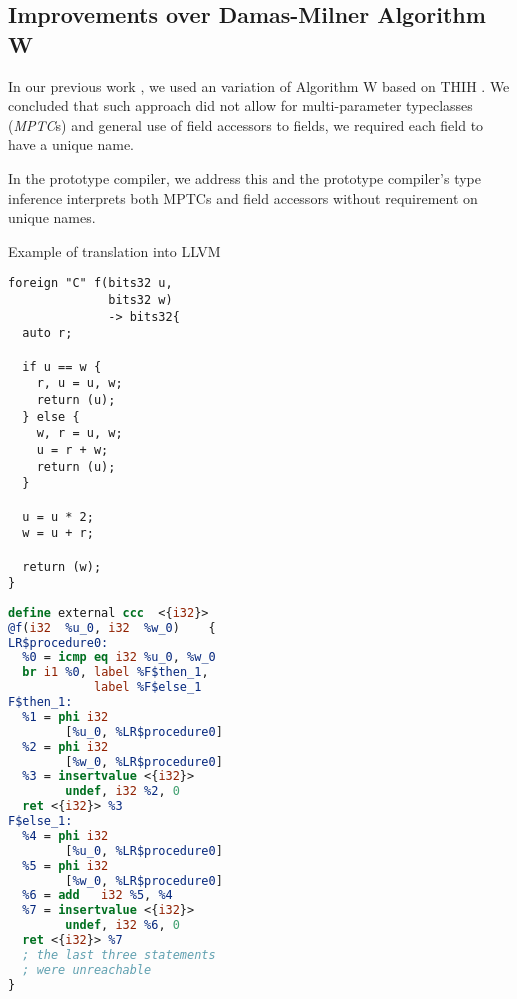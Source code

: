 \subsection{Improvements over Damas-Milner Algorithm W}

In our previous work \cite{klepl2020type}, we used an variation of Algorithm W based on THIH \cite{jones1999typing}. We concluded that such approach did not allow for multi-parameter typeclasses (\emph{MPTC}s) and general use of field accessors to  fields, we required each field to have a unique name.

In the prototype compiler, we address this and the prototype compiler's type inference interprets both MPTCs and field accessors without requirement on unique names.
\begin{listing}
    \small
    \caption{Example of translation into LLVM}
    \label{lst:translex}
    \begin{center}
    \begin{minipage}{0.5\linewidth}
    \begin{lstlisting}
foreign "C" f(bits32 u,
              bits32 w)
              -> bits32{
  auto r;

  if u == w {
    r, u = u, w;
    return (u);
  } else {
    w, r = u, w;
    u = r + w;
    return (u);
  }

  u = u * 2;
  w = u + r;

  return (w);
}
    \end{lstlisting}
    \end{minipage}%
    \begin{minipage}{0.5\linewidth}
    \begin{lstlisting}[language=LLVM]
define external ccc  <{i32}>
@f(i32  %u_0, i32  %w_0)    {
LR$procedure0:
  %0 = icmp eq i32 %u_0, %w_0
  br i1 %0, label %F$then_1,
            label %F$else_1
F$then_1:
  %1 = phi i32
        [%u_0, %LR$procedure0]
  %2 = phi i32
        [%w_0, %LR$procedure0]
  %3 = insertvalue <{i32}>
        undef, i32 %2, 0
  ret <{i32}> %3
F$else_1:
  %4 = phi i32
        [%u_0, %LR$procedure0]
  %5 = phi i32
        [%w_0, %LR$procedure0]
  %6 = add   i32 %5, %4
  %7 = insertvalue <{i32}>
        undef, i32 %6, 0
  ret <{i32}> %7
  ; the last three statements
  ; were unreachable
}
    \end{lstlisting}
    \end{minipage}
    \end{center}
\end{listing}
